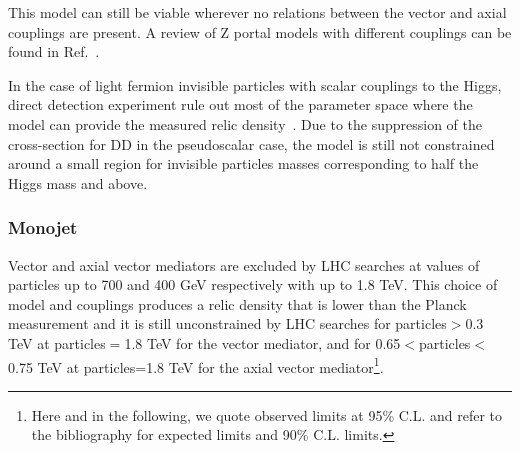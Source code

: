 This model can still be viable wherever no relations between the vector and axial couplings are present. A review of Z portal models with different couplings can be found in Ref.~\cite{Arcadi:2014lta}. 



In the case of light fermion invisible particles with scalar couplings to the Higgs, direct detection experiment rule out most of the parameter space where the model can provide the measured relic density~\cite{Escudero:2016gzx,Djouadi:2011aa}. Due to the suppression of the cross-section for DD in the pseudoscalar case, the model is still not constrained around a small region for invisible particles masses corresponding to half the Higgs mass and above. %

\subsubsection{Monojet}

Vector and axial vector mediators are excluded by LHC searches at values of \minvisible particles up to 700 and 400 GeV respectively with \mmed up to 1.8 TeV. This choice of model and couplings produces a relic density that is lower than the Planck measurement and it is still unconstrained by LHC searches for \minvisible particles$>$0.3 TeV at \minvisible particles$=$1.8 TeV for the vector mediator, and for 0.65$<$\minvisible particles$<$0.75 TeV at \minvisible particles=1.8 TeV for the axial vector mediator\footnote{Here and in the following, we quote observed limits at 95\% C.L. and refer to the bibliography for expected limits and 90\% C.L. limits.}. 
